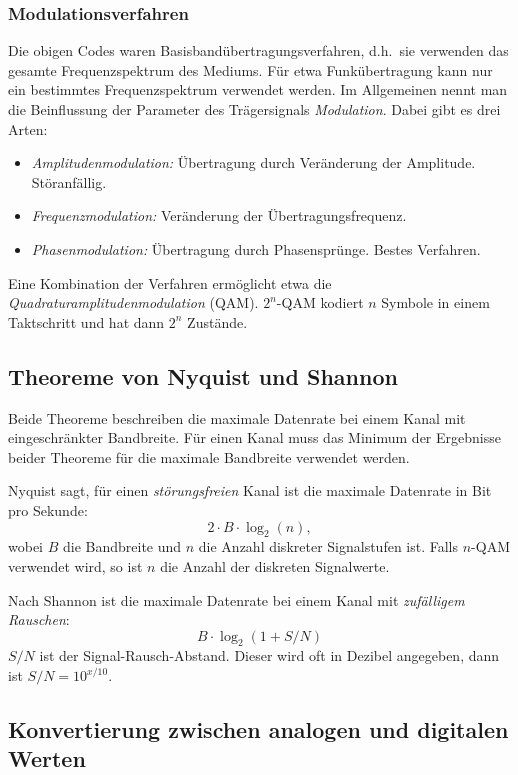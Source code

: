 \documentclass[a4paper,parskip=half*,DIV=15,fontsize=11pt]{scrartcl}
\begin{document}
\subsubsection{Modulationsverfahren}

Die obigen Codes waren Basisbandübertragungsverfahren, d.h.\ sie verwenden das gesamte Frequenzspektrum des Mediums. Für etwa Funkübertragung kann nur ein bestimmtes Frequenzspektrum verwendet werden. Im Allgemeinen nennt man die Beinflussung der Parameter des Trägersignals \emph{Modulation}. Dabei gibt es drei Arten:

\begin{itemize}
    \item \emph{Amplitudenmodulation:} Übertragung durch Veränderung der Amplitude. Störanfällig.
    \item \emph{Frequenzmodulation:} Veränderung der Übertragungsfrequenz.
    \item \emph{Phasenmodulation:} Übertragung durch Phasensprünge. Bestes Verfahren.
\end{itemize}

Eine Kombination der Verfahren ermöglicht etwa die \emph{Quadraturamplitudenmodulation} (QAM). $2^n$-QAM kodiert $n$ Symbole in einem Taktschritt und hat dann $2^n$ Zustände.

\subsection{Theoreme von Nyquist und Shannon}

Beide Theoreme beschreiben die maximale Datenrate bei einem Kanal mit eingeschränkter Bandbreite. Für einen Kanal muss das Minimum der Ergebnisse beider Theoreme für die maximale Bandbreite verwendet werden.

Nyquist sagt, für einen \emph{störungsfreien} Kanal ist die maximale Datenrate in Bit pro Sekunde:
\[2 \cdot B \cdot \log_2(n),\] wobei $B$ die Bandbreite und $n$ die Anzahl diskreter Signalstufen ist. Falls $n$-QAM verwendet wird, so ist $n$ die Anzahl der diskreten Signalwerte.

Nach Shannon ist die maximale Datenrate bei einem Kanal mit \emph{zufälligem Rauschen}:
\[B \cdot \log_2(1 + S/N)\]
$S/N$ ist der Signal-Rausch-Abstand. Dieser wird oft in Dezibel angegeben, dann ist $S/N = 10^{x/10}$.

\subsection{Konvertierung zwischen analogen und digitalen Werten}
\end{document}
